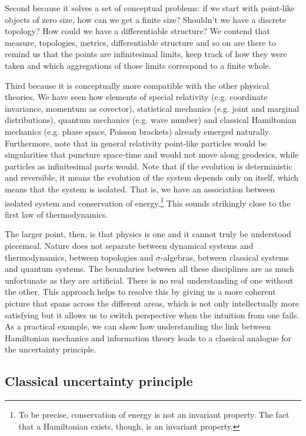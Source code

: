 \documentclass[11pt]{elsarticle}
\begin{document}
Second because it solves a set of conceptual problems: if we start with point-like objects of zero size, how can we get a finite size? Shouldn't we have a discrete topology? How could we have a differentiable structure? We contend that measure, topologies, metrics, differentiable structure and so on are there to remind us that the points are infinitesimal limits, keep track of how they were taken and which aggregations of those limits correspond to a finite whole.

Third because it is conceptually more compatible with the other physical theories. We have seen how elements of special relativity (e.g. coordinate invariance, momentum as covector), statistical mechanics (e.g. joint and marginal distributions), quantum mechanics (e.g. wave number) and classical Hamiltonian mechanics (e.g. phase space, Poisson brackets) already emerged naturally. Furthermore, note that in general relativity point-like particles would be singularities that puncture space-time and would not move along geodesics, while particles as infinitesimal parts would. Note that if the evolution is deterministic and reversible, it means the evolution of the system depends only on itself, which means that the system is isolated. That is, we have an association between isolated system and conservation of energy.\footnote{To be precise, conservation of energy is not an invariant property. The fact that a Hamiltonian exists, though, is an invariant property.} This sounds strikingly close to the first law of thermodynamics.

The larger point, then, is that physics is one and it cannot truly be understood piecemeal. Nature does not separate between dynamical systems and thermodynamics, between topologies and $\sigma$-algebras, between classical systems and quantum systems. The boundaries between all these disciplines are as much unfortunate as they are artificial. There is no real understanding of one without the other. This approach helps to resolve this by giving us a more coherent picture that spans across the different areas, which is not only intellectually more satisfying but it allows us to switch perspective when the intuition from one fails. As a practical example, we can show how understanding the link between Hamiltonian mechanics and information theory leads to a classical analogue for the uncertainty principle.

\subsection*{Classical uncertainty principle}
\end{document}
